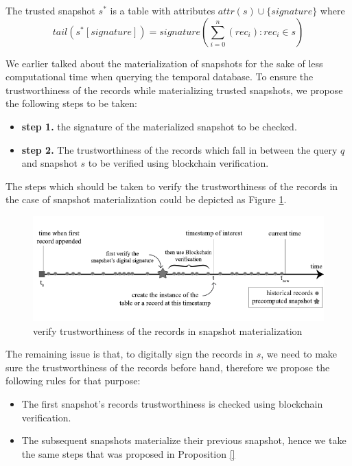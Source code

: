 			\begin{defn} 
				The trusted snapshot $s^*$ is a table with attributes $attr(s)\cup \{signature\}$ where $$tail(s^*[signature]) = signature(\sum_{i=0}^n (rec_i):rec_i \in s)$$
			\label{defn:trusted_snapshot}
			\end{defn}

			\begin{defn} 
				We earlier talked about the materialization of snapshots for the sake of less computational time when querying the temporal database. To ensure the trustworthiness of the records while materializing trusted snapshots, we propose the following steps to be taken:
				\begin{itemize}
					\item \textbf{step 1.} the signature of the materialized snapshot to be checked.
					\item \textbf{step 2.} The trustworthiness of the records which fall in between the query $q$ and snapshot $s$ to be verified using blockchain verification.
				\end{itemize}
				The steps which should be taken to verify the trustworthiness of the records in the case of snapshot materialization could be depicted as Figure \ref{fig:blockchain_snapshot_materialization}.
			\label{defn:trusted_snapshot}
			\end{defn}
			\begin{figure}
				\centering
				\includegraphics[width=\textwidth]{figs/trusted_snapshot_materialization.pdf}
				\caption{verify trustworthiness of the records in snapshot materialization}
				\label{fig:blockchain_snapshot_materialization}
			\end{figure}

			The remaining issue is that, to digitally sign the records in $s$, we need to make sure the trustworthiness of the records before hand, therefore we propose the following rules for that purpose:

			\begin{itemize}
				\item The first snapshot's records trustworthiness is checked using blockchain verification.
				\item The subsequent snapshots materialize their previous snapshot, hence we take the same steps that was proposed in Proposition \ref{}
			\end{itemize}

